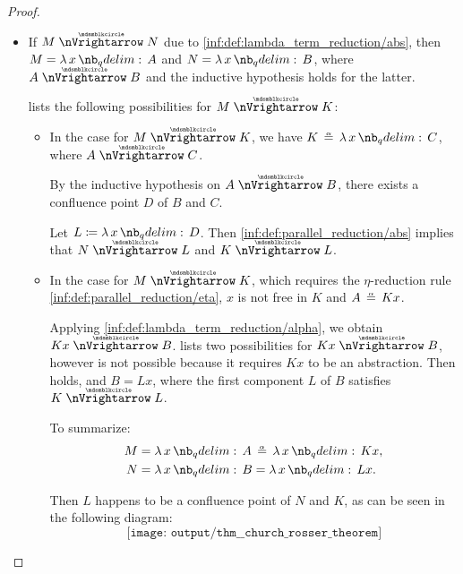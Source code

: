 \begin{proof}
\begin{itemize}
    \item If \( M \ppred N \) due to \ref{inf:def:lambda_term_reduction/abs}, then \( M = \qabs x A \) and \( N = \qabs x B \), where \( A \ppred B \) and the inductive hypothesis holds for the latter.

     lists the following possibilities for \( M \ppred K \):
    \begin{itemize}
      \item In the case  for \( M \ppred K \), we have \( K \aequiv \qabs x C \), where \( A \ppred C \).

      By the inductive hypothesis on \( A \ppred B \), there exists a confluence point \( D \) of \( B \) and \( C \).

      Let \( L \coloneqq \qabs x D \). Then \ref{inf:def:parallel_reduction/abs} implies that \( N \ppred L \) and \( K \ppred L \).

      \item In the case  for \( M \ppred K \), which requires the \( \eta \)-reduction rule \ref{inf:def:parallel_reduction/eta}, \( x \) is not free in \( K \) and \( A \aequiv Kx \).

      Applying \ref{inf:def:lambda_term_reduction/alpha}, we obtain \( Kx \ppred B \).  lists two possibilities for \( Kx \ppred B \), however  is not possible because it requires \( Kx \) to be an abstraction. Then  holds, and \( B = Lx \), where the first component \( L \) of \( B \) satisfies \( K \ppred L \).

      To summarize:
      \begin{align*}
        M &= \qabs x A \aequiv \qabs x Kx, \\
        N &= \qabs x B = \qabs x Lx. \\
      \end{align*}

      Then \( L \) happens to be a confluence point of \( N \) and \( K \), as can be seen in the following diagram:
      \begin{equation*}
        \texttt{[image: output/thm\_\_church\_rosser\_theorem]}
      \end{equation*}
    \end{itemize}


\end{itemize}
\end{proof}
